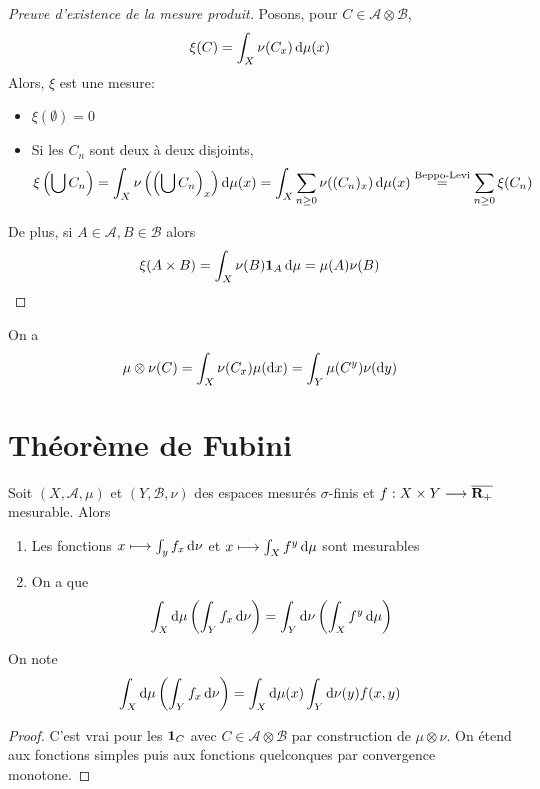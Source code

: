 \begin{proof}[Preuve d'existence de la mesure produit]
Posons, pour $C \in  \mathcal  A\otimes \mathcal  B$, \[
    \xi(C)=\int_X \nu(C_x)\mathop{}\!\mathrm d \mu(x)
\] 
Alors, $\xi$ est une mesure:  \begin{itemize}
    \item $\xi(\emptyset ) = 0$
    \item Si les  $C_n$ sont deux à deux disjoints,  \[
            \xi \left(  \bigcup C_n\right)=\int_X \nu \left(  \left(\bigcup C_n\right)_x\right)\mathop{}\!\mathrm d\mu(x)=\int_X \sum_{n\geq 0} \nu((C_n)_x)\mathop{}\!\mathrm d\mu(x)\overset{\text{Beppo-Levi}}=\sum_{n\geq 0}\xi(C_n)
    \] 
\end{itemize}
    De plus, si $A \in  \mathcal A, B \in  \mathcal  B$ alors \[
        \xi(A\times B)=\int_X\nu(B)\bm{1}_A\mathop{}\!\mathrm d\mu=\mu(A)\nu(B)
    \] 
\end{proof}

\begin{cor}
On a \[
    \mu\otimes \nu(C)=\int_X \nu(C_x)\mu(\mathop{}\!\mathrm d x)=\int_Y\mu(C^y)\nu(\mathop{}\!\mathrm d y)
\] 
\end{cor}

\section{Théorème de Fubini}

\begin{thm}
    Soit $(X, \mathcal  A, \mu)$ et $(Y, \mathcal  B, \nu)$ des espaces mesurés $\sigma$-finis et $f:X\times Y\longrightarrow \overline{\mathbf R_+}$ mesurable. Alors \begin{enumerate}
        \item Les fonctions $x \longmapsto \int_y f_x\mathop{}\!\mathrm d \nu$ et $x \longmapsto \int_X f^y\mathop{}\!\mathrm d \mu$ sont mesurables
        \item On a que \[
                \int_X \mathop{}\!\mathrm d\mu \left( \int_Y f_x\mathop{}\!\mathrm d \nu \right)=\int_Y \mathop{}\!\mathrm d\nu \left( \int_X f^y\mathop{}\!\mathrm d \mu \right)
        \] 
    \end{enumerate}
\end{thm}

\begin{rem}
On note \[
    \int_X\mathop{}\!\mathrm d \mu \left(  \int_Y f_x\mathop{}\!\mathrm d \nu\right) = \int_X \mathop{}\!\mathrm d\mu(x) \int _Y \mathop{}\!\mathrm d\nu(y) f(x, y)
\] 
\end{rem}

\begin{proof}
C'est vrai pour les $\bm{1}_C$ avec  $C \in  \mathcal  A\otimes \mathcal  B$ par construction de $\mu\otimes \nu$. On étend aux fonctions simples puis aux fonctions quelconques par convergence monotone.
\end{proof}
